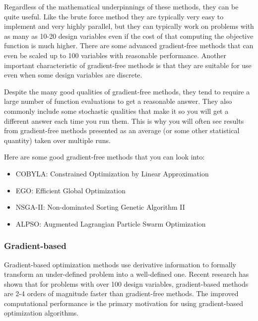 \documentclass[conf]{new-aiaa}
\begin{document}
            Regardless of the mathematical underpinnings of these methods, they can be quite useful. 
            Like the brute force method they are typically very easy to implement and very highly parallel, but they can typically work on problems with as many as 10-20 design variables even if the cost of that computing the objective function is much higher. 
            There are some advanced gradient-free methods that can even be scaled up to 100 variables with reasonable performance. 
            Another important characteristic of gradient-free methods is that they are suitable for use even when some design variables are discrete. 

            Despite the many good qualities of gradient-free methods, they tend to require a large number of function evaluations to get a reasonable answer. 
            They also commonly include some stochastic qualities that make it so you will get a different answer each time you run them. 
            This is why you will often see results from gradient-free methods presented as an average (or some other statistical quantity) taken over multiple runs. 

            Here are some good gradient-free methods that you can look into: 
            \begin{itemize}
                \item COBYLA: Constrained Optimization by Linear Approximation
                \item EGO: Efficient Global Optimization 
                \item NSGA-II: Non-dominated Sorting Genetic Algorithm II
                \item ALPSO: Augmented Lagrangian Particle Swarm Optimization
            \end{itemize}%

        \subsubsection{Gradient-based}

            Gradient-based optimization methods use derivative information to formally transform an under-defined problem into a well-defined one.  
            Recent research has shown that for problems with over 100 design variables, gradient-based methods are 2-4 orders of magnitude faster than gradient-free methods. 
            The improved computational performance is the primary motivation for using gradient-based optimization algorithms. 
            
\end{document}
